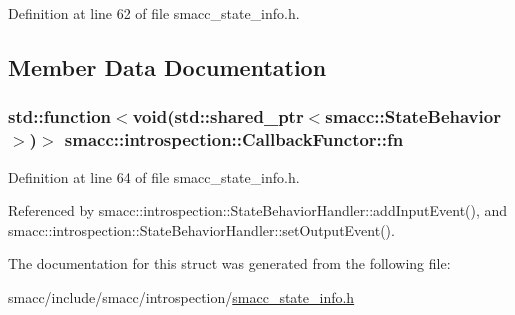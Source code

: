 Definition at line 62 of file smacc\+\_\+state\+\_\+info.\+h.



\subsection{Member Data Documentation}
\subsubsection[{\texorpdfstring{fn}{fn}}]{\setlength{\rightskip}{0pt plus 5cm}std\+::function$<$void(std\+::shared\+\_\+ptr$<${\bf smacc\+::\+State\+Behavior}$>$)$>$ smacc\+::introspection\+::\+Callback\+Functor\+::fn}\hypertarget{structsmacc_1_1introspection_1_1CallbackFunctor_a61ff14c7fccf031d0e4afa54470ac220}{}\label{structsmacc_1_1introspection_1_1CallbackFunctor_a61ff14c7fccf031d0e4afa54470ac220}


Definition at line 64 of file smacc\+\_\+state\+\_\+info.\+h.



Referenced by smacc\+::introspection\+::\+State\+Behavior\+Handler\+::add\+Input\+Event(), and smacc\+::introspection\+::\+State\+Behavior\+Handler\+::set\+Output\+Event().



The documentation for this struct was generated from the following file\+:\begin{DoxyCompactItemize}
\item 
smacc/include/smacc/introspection/\hyperlink{smacc__state__info_8h}{smacc\+\_\+state\+\_\+info.\+h}\end{DoxyCompactItemize}
